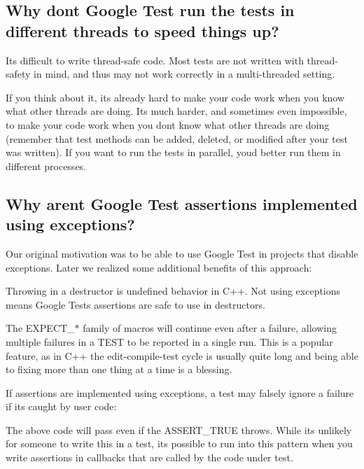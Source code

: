\subsection*{Why don\textquotesingle{}t Google Test run the tests in different threads to speed things up?}

It\textquotesingle{}s difficult to write thread-\/safe code. Most tests are not written with thread-\/safety in mind, and thus may not work correctly in a multi-\/threaded setting.

If you think about it, it\textquotesingle{}s already hard to make your code work when you know what other threads are doing. It\textquotesingle{}s much harder, and sometimes even impossible, to make your code work when you don\textquotesingle{}t know what other threads are doing (remember that test methods can be added, deleted, or modified after your test was written). If you want to run the tests in parallel, you\textquotesingle{}d better run them in different processes.

\subsection*{Why aren\textquotesingle{}t Google Test assertions implemented using exceptions?}

Our original motivation was to be able to use Google Test in projects that disable exceptions. Later we realized some additional benefits of this approach\+:


\begin{DoxyEnumerate}
\item Throwing in a destructor is undefined behavior in C++. Not using exceptions means Google Test\textquotesingle{}s assertions are safe to use in destructors.
\end{DoxyEnumerate}
\begin{DoxyEnumerate}
\item The {\ttfamily E\+X\+P\+E\+C\+T\+\_\+$\ast$} family of macros will continue even after a failure, allowing multiple failures in a {\ttfamily T\+E\+ST} to be reported in a single run. This is a popular feature, as in C++ the edit-\/compile-\/test cycle is usually quite long and being able to fixing more than one thing at a time is a blessing.
\end{DoxyEnumerate}
\begin{DoxyEnumerate}
\item If assertions are implemented using exceptions, a test may falsely ignore a failure if it\textquotesingle{}s caught by user code\+: 
\begin{DoxyCode}{0}
\end{DoxyCode}
 The above code will pass even if the {\ttfamily A\+S\+S\+E\+R\+T\+\_\+\+T\+R\+UE} throws. While it\textquotesingle{}s unlikely for someone to write this in a test, it\textquotesingle{}s possible to run into this pattern when you write assertions in callbacks that are called by the code under test.
\end{DoxyEnumerate}

